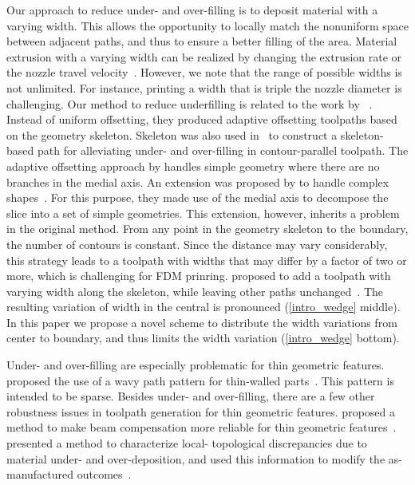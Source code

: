 Our approach to reduce under- and over-filling is to deposit material with a varying width.
This allows the opportunity to locally match the nonuniform space between adjacent paths, and thus to ensure a better filling of the area.
Material extrusion with a varying width can be realized by changing the extrusion rate or the nozzle travel velocity~\cite{Ertay2018,Kuipers2018}.
However, we note that the range of possible widths is not unlimited.
For instance, printing a width that is triple the nozzle diameter is challenging.
Our method to reduce underfilling is related to the work by \citeauthor{kao1998optimal}~\cite{kao1998optimal}.
Instead of uniform offsetting, they produced adaptive offsetting toolpaths based on the geometry skeleton. 
Skeleton was also used in~\cite{Jin2017RCIM} to construct a skeleton-based path for alleviating under- and over-filling in contour-parallel toolpath. 
The adaptive offsetting approach by \citeauthor{kao1998optimal} handles simple geometry where there are no branches in the medial axis.
An extension was proposed by \citeauthor{Ding2016a} to handle complex shapes~\cite{Ding2016a}.
For this purpose, they made use of the medial axis to decompose the slice into a set of simple geometries.
This extension, however, inherits a problem in the original method.
From any point in the geometry skeleton to the boundary, the number of contours is constant.
Since the distance may vary considerably, this strategy leads to a toolpath with widths that may differ by a factor of two or more, which is challenging for FDM prinring.
\citeauthor{Jin2017JMS} proposed to add a toolpath with varying width along the skeleton, while leaving other paths unchanged~\cite{Jin2017JMS}.
The resulting variation of width in the central is pronounced (\cref{intro_wedge} middle).
In this paper we propose a novel scheme to distribute the width variations from center to boundary, and thus limits the width variation (\cref{intro_wedge} bottom).

Under- and over-filling are especially problematic for thin geometric features.
\citeauthor{Jin2017a} proposed the use of a wavy path pattern for thin-walled parts~\cite{Jin2017a}.
This pattern is intended to be sparse. 
Besides under- and over-filling, there are a few other robustness issues in toolpath generation for thin geometric features.
\citeauthor{Moesen2011} proposed a method to make beam compensation more reliable for thin geometric features~\cite{Moesen2011}.
\citeauthor{Behandish2019a} presented a method to characterize local- topological discrepancies due to material under- and over-deposition, and used this information to modify the as-manufactured outcomes~\cite{Behandish2019a}. 



